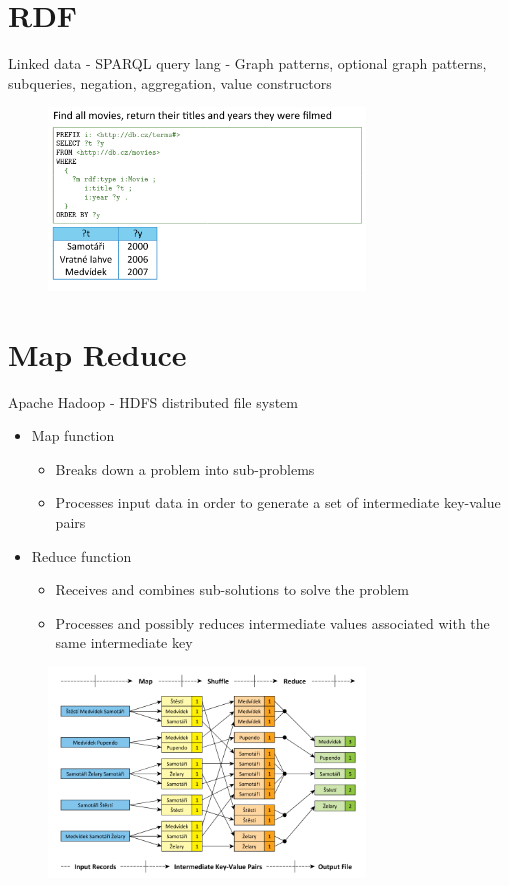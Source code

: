 \section{RDF}
Linked data - SPARQL query lang - Graph patterns, optional graph patterns, subqueries, negation, aggregation, value constructors
\begin{figure}[ht!]
\centering
\includegraphics[width=0.75\textwidth]{oborove/DS2/img/sparql.png}
\end{figure}

\section{Map Reduce}
Apache Hadoop - HDFS distributed file system

\begin{itemize}
    \item Map function
    \begin{itemize}
        \item Breaks down a problem into sub-problems
        \item Processes input data in order to generate a set of intermediate key-value pairs
    \end{itemize}
    \item  Reduce function
    \begin{itemize}
        \item Receives and combines sub-solutions to solve the problem
        \item Processes and possibly reduces intermediate values associated with the same intermediate key
    \end{itemize}
\end{itemize}

\begin{figure}[ht!]
\centering
\includegraphics[width=0.75\textwidth]{oborove/DS2/img/mapreduce.png}
\end{figure}

